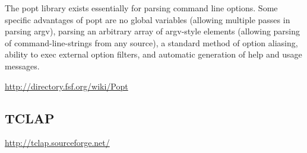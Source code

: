 The popt library exists essentially for parsing command line options. Some
specific advantages of popt are no global variables (allowing multiple passes in
parsing argv), parsing an arbitrary array of argv-style elements (allowing
parsing of command-line-strings from any source), a standard method of option
aliasing, ability to exec external option filters, and automatic generation of
help and usage messages.    

\url{http://directory.fsf.org/wiki/Popt}

\subsection{TCLAP}
\label{sec:TCLAP}

\url{http://tclap.sourceforge.net/}

